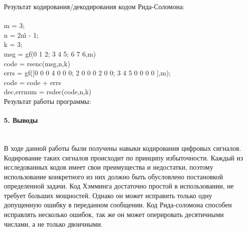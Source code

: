 \documentclass[12pt,a4paper]{report}
\begin{document}
Результат кодирования/декодирования кодом Рида-Соломона:\\\\
m = 3;\\
n = 2\^m - 1;\\
k = 3;\\
msg = gf(0 1 2; 3 4 5; 6 7 6,m)\\
code = rsenc(msg,n,k)\\
errs = gf([0 0 0 4 0 0 0; 2 0 0 0 2 0 0; 3 4 5 0 0 0 0 ],m);\\
code = code + errs\\
dec,errnum = rsdec(code,n,k)\\
\newpage
Результат работы программы:
\begin{figure}[h!]
\end{figure}
\begin{figure}[h!]
\end{figure}

\paragraph{5. Выводы \\\\}
В ходе данной работы были получены навыки кодирования цифровых сигналов. Кодирование таких сигналов происходит по принципу избыточности. Каждый из исследованных кодов имеет свои преимущества и недостатки, поэтому использование конкретного из них должно быть обусловлено постановкой определенной задачи. Код Хэмминга достаточно простой в использовании, не требует больших мощностей. Однако он может исправить только одну допущенную ошибку в переданном сообщении. Код Рида-соломона способен исправлять несколько ошибок, так же он может оперировать десятичными числами, а не только двоичными.
\end{document}
